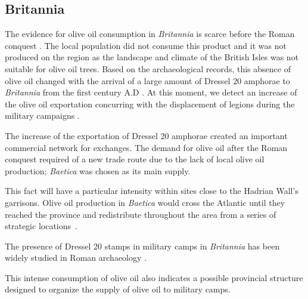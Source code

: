 \documentclass[review]{elsarticle}
\newcommand{\memo}[2]{\textcolor{#1}{#2}}
\newcommand{\xavi}[1]{\memo{magenta}{XRC: #1\\}}
\begin{document}
\subsection{Britannia}

The evidence for olive oil consumption in \textit{Britannia} is scarce before the Roman conquest \citep{funari_corpus_1996,carreras_abastecimiento_2003}. The local population did not consume this product and it was not produced on the region as the landscape and climate of the British Isles was not suitable for olive oil trees\citep[161]{monfort_britanniaen_1998}. Based on the archaeological records, this absence of olive oil changed with the arrival of a large amount of Dressel 20 amphorae to \textit{Britannia} from the first century A.D \citep{peacock_amphorae_1991,
carreras_britannia_1998}. At this moment, we detect an increase of the olive oil exportation concurring with the displacement of legions during the military campaigns \citep[161]{monfort_britanniaen_1998}.

The increase of the exportation of Dressel 20 amphorae created an important commercial network for exchanges. The demand for olive oil after the Roman conquest required of a new trade route due to the lack of local olive oil production; \textit{Baetica} was chosen as its main supply.


This fact will have a particular intensity within sites close to the Hadrian Wall's garrisons. Olive oil production in \textit{Baetica} would cross the Atlantic until they reached the province and redistribute throughout the area from a series of strategic locations~\citep{carreras_atlantic_2012}. 


The presence of Dressel 20 stamps in military camps in \textit{Britannia} has been widely studied in Roman archaeology \citep{williams_importation_1983,
funari_corpus_1996,
carreras_britannia_1998,carreras_abastecimiento_2003}.

This intense consumption of olive oil also indicates a possible provincial structure designed to organize the supply of olive oil to military camps. 
\end{document}
